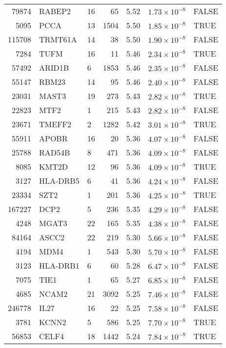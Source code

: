 \begin{table}[ht]
\begin{adjustbox}{totalheight=10in}
\begin{tabular}{rllrrrl}
  79874 & RABEP2 & 16 &  65 & 5.52 & $1.73 \times 10^{-8}$ & FALSE \\ 
  5095 & PCCA & 13 & 1504 & 5.50 & $1.85 \times 10^{-8}$ & TRUE \\ 
  115708 & TRMT61A & 14 &  38 & 5.50 & $1.90 \times 10^{-8}$ & FALSE \\ 
  7284 & TUFM & 16 &  11 & 5.46 & $2.34 \times 10^{-8}$ & TRUE \\ 
  57492 & ARID1B & 6 & 1853 & 5.46 & $2.35 \times 10^{-8}$ & FALSE \\ 
  55147 & RBM23 & 14 &  95 & 5.46 & $2.40 \times 10^{-8}$ & FALSE \\ 
  23031 & MAST3 & 19 & 273 & 5.43 & $2.82 \times 10^{-8}$ & TRUE \\ 
  22823 & MTF2 & 1 & 215 & 5.43 & $2.82 \times 10^{-8}$ & FALSE \\ 
  23671 & TMEFF2 & 2 & 1282 & 5.42 & $3.01 \times 10^{-8}$ & TRUE \\ 
  55911 & APOBR & 16 &  20 & 5.36 & $4.07 \times 10^{-8}$ & FALSE \\ 
  25788 & RAD54B & 8 & 471 & 5.36 & $4.09 \times 10^{-8}$ & FALSE \\ 
  8085 & KMT2D & 12 &  96 & 5.36 & $4.09 \times 10^{-8}$ & TRUE \\ 
  3127 & HLA-DRB5 & 6 &  41 & 5.36 & $4.24 \times 10^{-8}$ & FALSE \\ 
  23334 & SZT2 & 1 & 201 & 5.36 & $4.25 \times 10^{-8}$ & TRUE \\ 
  167227 & DCP2 & 5 & 236 & 5.35 & $4.29 \times 10^{-8}$ & FALSE \\ 
  4248 & MGAT3 & 22 & 165 & 5.35 & $4.38 \times 10^{-8}$ & FALSE \\ 
  84164 & ASCC2 & 22 & 219 & 5.30 & $5.66 \times 10^{-8}$ & FALSE \\ 
  4194 & MDM4 & 1 & 543 & 5.30 & $5.70 \times 10^{-8}$ & FALSE \\ 
  3123 & HLA-DRB1 & 6 &  60 & 5.28 & $6.47 \times 10^{-8}$ & FALSE \\ 
  7075 & TIE1 & 1 &  65 & 5.27 & $6.85 \times 10^{-8}$ & FALSE \\ 
  4685 & NCAM2 & 21 & 3092 & 5.25 & $7.46 \times 10^{-8}$ & FALSE \\ 
  246778 & IL27 & 16 &  22 & 5.25 & $7.58 \times 10^{-8}$ & FALSE \\ 
  3781 & KCNN2 & 5 & 586 & 5.25 & $7.70 \times 10^{-8}$ & TRUE \\ 
  56853 & CELF4 & 18 & 1442 & 5.24 & $7.84 \times 10^{-8}$ & TRUE \\ 

\end{tabular}
\end{adjustbox}
\end{table}
